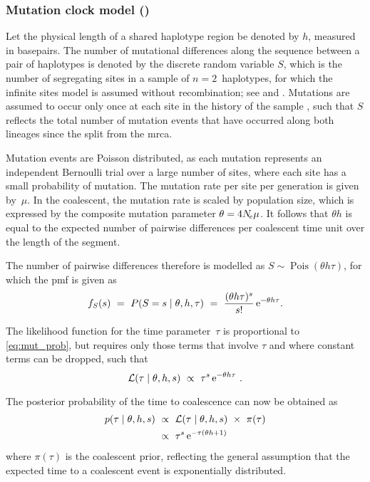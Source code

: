 %
\subsubsection{Mutation clock model (\ClockM)}\label{sec:mut_clock}
%


Let the physical length of a shared haplotype region be denoted by $h$, measured in basepairs.
The number of mutational differences along the sequence between a pair of haplotypes is denoted by the discrete random variable $S$, which is the number of segregating sites in a sample of ${n=2}$~haplotypes, for which the infinite sites model is assumed without recombination; \eg see \citet{Watterson:1975ur} and \citet{Tavare:1997vra}.
Mutations are assumed to occur only once at each site in the history of the sample \citep{Kimura:1969tn}, such that $S$ reflects the total number of mutation events that have occurred along both lineages since the split from the \gls{mrca}.

Mutation events are Poisson distributed, as each mutation represents an independent Bernoulli trial over a large number of sites, where each site has a small probability of mutation.
The mutation rate per site per generation is given by~$\mu$.
In the coalescent, the mutation rate is scaled by population size, which is expressed by the composite mutation parameter ${\theta = 4N_{\!e}\mu}$.
It follows that ${\theta h}$ is equal to the expected number of pairwise differences per coalescent time unit over the length of the segment.

The number of pairwise differences therefore is modelled as ${S \sim \operatorname{Pois}(\theta h \tau)}$, for which the \gls{pmf} is given as
\begin{equation}\label{eq:mut_prob}
	f_S(s)~=~P(S=s \mid \theta,h,\tau) ~=~ \frac{(\theta h \tau)^s}{s!} \,\mathrm{e}^{-\theta h \tau}\text{.}
\end{equation}

The likelihood function for the time parameter~$\tau$ is proportional to \cref{eq:mut_prob}, but requires only those terms that involve $\tau$ and where constant terms can be dropped, such that
\begin{equation}\label{eq:mut_like}
	\mathcal{L}(\tau \mid \theta,h,s) ~\propto~ \tau^s \,\mathrm{e}^{-\theta h \tau}\ .
\end{equation}

The posterior probability of the time to coalescence can now be obtained as
\begin{equation}\label{eq:mut_post}
\begin{split}
	p(\tau \mid \theta,h,s)
	&~\propto~ \mathcal{L}(\tau \mid \theta,h,s)~\times~\pi(\tau) \\
	&~\propto~ \tau^s \,\mathrm{e}^{- \tau (\theta h +1)}
\end{split}
\end{equation}
where $\pi(\tau)$ is the coalescent prior, reflecting the general assumption that the expected time to a coalescent event is exponentially distributed.

